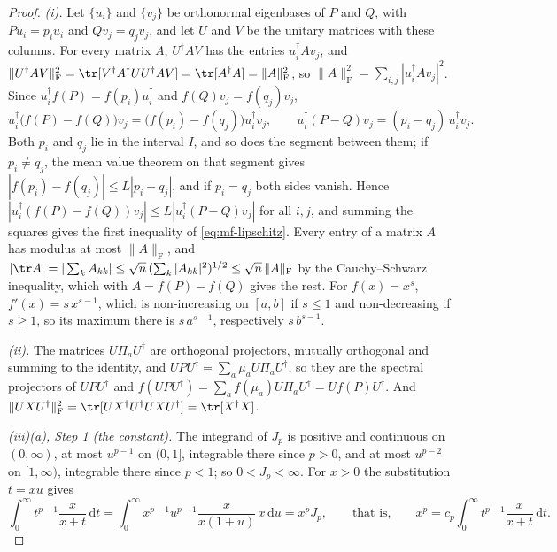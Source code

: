 \begin{proof}
\emph{(i).} Let $\{u_i\}$ and $\{v_j\}$ be orthonormal eigenbases of $P$ and
$Q$, with $Pu_i=p_iu_i$ and $Qv_j=q_jv_j$, and let $U$ and $V$ be the unitary
matrices with these columns. For every matrix $A$, $U^{\dagger}AV$ has the
entries $u_i^{\dagger}Av_j$, and
$\|U^{\dagger}AV\|_{\mathrm F}^{2}=\tr[V^{\dagger}A^{\dagger}UU^{\dagger}AV]
=\tr[A^{\dagger}A]=\|A\|_{\mathrm F}^{2}$, so
$\|A\|_{\mathrm F}^{2}=\sum_{i,j}|u_i^{\dagger}Av_j|^{2}$. Since
$u_i^{\dagger}f(P)=f(p_i)u_i^{\dagger}$ and $f(Q)v_j=f(q_j)v_j$,
\begin{equation*}
  u_i^{\dagger}\big(f(P)-f(Q)\big)v_j=\big(f(p_i)-f(q_j)\big)u_i^{\dagger}v_j,
  \qquad
  u_i^{\dagger}(P-Q)v_j=(p_i-q_j)\,u_i^{\dagger}v_j .
\end{equation*}
Both $p_i$ and $q_j$ lie in the interval $I$, and so does the segment between
them; if $p_i\ne q_j$, the mean value theorem on that segment gives
$|f(p_i)-f(q_j)|\le L|p_i-q_j|$, and if $p_i=q_j$ both sides vanish. Hence
$|u_i^{\dagger}(f(P)-f(Q))v_j|\le L|u_i^{\dagger}(P-Q)v_j|$ for all $i,j$,
and summing the squares gives the first inequality of
\eqref{eq:mf-lipschitz}. Every entry of a matrix $A$ has modulus at most
$\|A\|_{\mathrm F}$, and
$|\tr A|=|\sum_kA_{kk}|\le\sqrt n\,(\sum_k|A_{kk}|^{2})^{1/2}
\le\sqrt n\,\|A\|_{\mathrm F}$ by the Cauchy--Schwarz inequality, which with
$A=f(P)-f(Q)$ gives the rest. For $f(x)=x^{s}$, $f'(x)=s\,x^{s-1}$, which is
non-increasing on $[a,b]$ if $s\le1$ and non-decreasing if $s\ge1$, so its
maximum there is $s\,a^{s-1}$, respectively $s\,b^{s-1}$.

\emph{(ii).} The matrices $U\Pi_aU^{\dagger}$ are orthogonal projectors,
mutually orthogonal and summing to the identity, and
$UPU^{\dagger}=\sum_a\mu_aU\Pi_aU^{\dagger}$, so they are the spectral
projectors of $UPU^{\dagger}$ and
$f(UPU^{\dagger})=\sum_af(\mu_a)U\Pi_aU^{\dagger}=Uf(P)U^{\dagger}$. And
$\|UXU^{\dagger}\|_{\mathrm F}^{2}=\tr[UX^{\dagger}U^{\dagger}UXU^{\dagger}]
=\tr[X^{\dagger}X]$.

\emph{(iii)(a), Step 1 (the constant).} The integrand of $J_p$ is positive
and continuous on $(0,\infty)$, at most $u^{p-1}$ on $(0,1]$, integrable
there since $p>0$, and at most $u^{p-2}$ on $[1,\infty)$, integrable there
since $p<1$; so $0<J_p<\infty$. For $x>0$ the substitution $t=xu$ gives
\begin{equation*}
  \int_0^{\infty}t^{p-1}\frac{x}{x+t}\,\mathrm dt
  =\int_0^{\infty}x^{p-1}u^{p-1}\frac{x}{x(1+u)}\,x\,\mathrm du
  =x^{p}J_p,
  \qquad\text{that is,}\qquad
  x^{p}=c_p\int_0^{\infty}t^{p-1}\frac{x}{x+t}\,\mathrm dt .
\end{equation*}


\end{proof}
